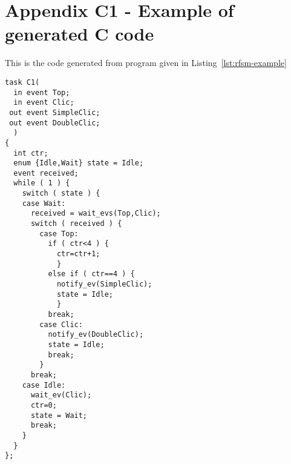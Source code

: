 \chapter*{Appendix C1 - Example of generated C code}  
\label{cha:ex1-c}

This is the code generated from program given in Listing~\ref{lst:rfsm-example} 

\begin{lstlisting}[language=ctask,frame=single,numbers=none,basicstyle=\small]
task C1(
  in event Top;
  in event Clic;
 out event SimpleClic;
 out event DoubleClic;
  )
{
  int ctr;
  enum {Idle,Wait} state = Idle;
  event received;
  while ( 1 ) {
    switch ( state ) {
    case Wait:
      received = wait_evs(Top,Clic);
      switch ( received ) {
        case Top:
          if ( ctr<4 ) {
            ctr=ctr+1;
            }
          else if ( ctr==4 ) {
            notify_ev(SimpleClic);
            state = Idle;
            }
          break;
        case Clic:
          notify_ev(DoubleClic);
          state = Idle;
          break;
        }
      break;
    case Idle:
      wait_ev(Clic);
      ctr=0;
      state = Wait;
      break;
    }
  }
};
\end{lstlisting}
